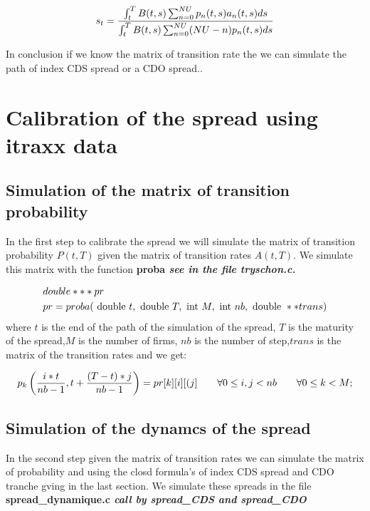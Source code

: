 \documentclass[reqno,11pt,twoside,english]{report}
\newcommand{\1}{{1} \hspace{-0.25 em}{\rm I}}
\begin{document}
$$s_t={\int_t^T B(t,s)\sum_{n=0}^{NU}p_n(t,s)a_n(t,s)ds\over \int_t^T B(t,s)\sum_{n=0}^{NU}(NU-n)p_n(t,s)ds}$$

In conclusion if we know the matrix of transition rate the we can simulate the path of index CDS spread or a CDO spread.. 

\section{Calibration of the spread using itraxx data}
\subsection{Simulation of the matrix of transition probability}
In the first step to calibrate the spread we will simulate the matrix of transition probability $P(t,T)$ given the matrix of transition rates $A(t,T)$. We simulate this matrix with the function \bf proba \sl see in the file \bf tryschon.c\sl.
\par\medskip
\begin{equation*}
\begin{split}
&double ***pr\\
&pr=proba(\hbox{ double } t,\hbox{ double } T, \hbox{ int } M,\hbox{ int }nb, \hbox{ double }**trans) 
\end{split}
\end{equation*}
where  $t$  is the end of the path of the simulation of the spread, $T$ is the maturity of the spread,$M$  is the  number of firms, $nb$ is the number of step,$trans$ is the matrix of the transition rates and we get:

\begin{equation*}
\begin{split}
p_k\left({i*t\over nb-1},t+{(T-t)*j\over nb-1}\right)=pr[k][i][(j]\qquad \forall 0 \le i,j<  nb \qquad \forall 0 \le k< M ;
\end{split}
\end{equation*}

\subsection{Simulation of the dynamcs of the spread}
In the second step given the matrix of transition rates we can simulate the matrix of probability and using the closd formula's of index CDS spread and CDO tranche gving in the last section. We simulate these spreads in the file \bf spread\_dynamique.c \sl  call  by \bf spread\_CDS \sl and \bf spread\_CDO\sl   
\end{document}
